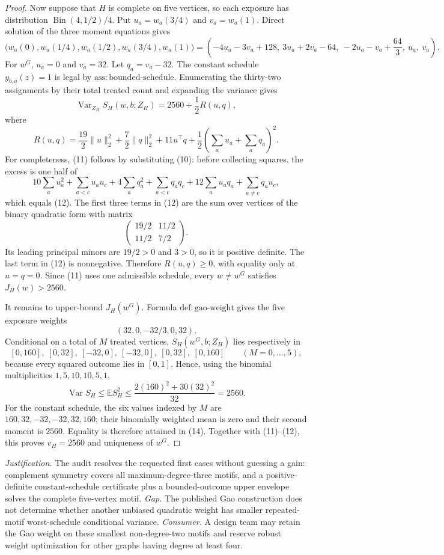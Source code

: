 \documentclass{article}
\begin{document}
\begin{proof}
Now suppose that \(H\) is complete on five vertices, so each exposure has distribution \(\operatorname{Bin}(4,1/2)/4\).  Put \(u_a=w_a(3/4)\) and \(v_a=w_a(1)\).  Direct solution of the three moment equations gives
\[
\bigl(w_a(0),w_a(1/4),w_a(1/2),w_a(3/4),w_a(1)\bigr)
=\left(-4u_a-3v_a+128,\ 3u_a+2v_a-64,\ -2u_a-v_a+\frac{64}{3},\ u_a,\ v_a\right). \tag{10}
\]
For \(w^G\), \(u_a=0\) and \(v_a=32\).  Let \(q_a=v_a-32\).  The constant schedule \(y_{b,a}(z)=1\) is legal by \(\mathrm{ass:bounded\text{-}schedule}\).  Enumerating the thirty-two assignments by their total treated count and expanding the variance gives
\[
\operatorname{Var}_{Z_H}S_H(w,b;Z_H)=2560+\frac12R(u,q), \tag{11}
\]
where
\[
R(u,q)=\frac{19}{2}\|u\|_2^2+\frac72\|q\|_2^2+11u^\top q+\frac12\left(\sum_a u_a+\sum_a q_a\right)^2. \tag{12}
\]
For completeness, (11) follows by substituting (10): before collecting squares, the excess is one half of
\[
10\sum_a u_a^2+\sum_{a<c}u_au_c+4\sum_a q_a^2+\sum_{a<c}q_aq_c
+12\sum_a u_aq_a+\sum_{a\ne c}q_au_c,
\]
which equals (12).  The first three terms in (12) are the sum over vertices of the binary quadratic form with matrix
\[
\begin{pmatrix}19/2&11/2\\11/2&7/2\end{pmatrix}.
\]
Its leading principal minors are \(19/2>0\) and \(3>0\), so it is positive definite.  The last term in (12) is nonnegative.  Therefore \(R(u,q)\ge0\), with equality only at \(u=q=0\).  Since (11) uses one admissible schedule, every \(w\ne w^G\) satisfies \(J_H(w)>2560\).

It remains to upper-bound \(J_H(w^G)\).  Formula \(\mathrm{def:gao\text{-}weight}\) gives the five exposure weights
\[
(32,0,-32/3,0,32).
\]
Conditional on a total of \(M\) treated vertices, \(S_H(w^G,b;Z_H)\) lies respectively in
\[
[0,160],\ [0,32],\ [-32,0],\ [-32,0],\ [0,32],\ [0,160]\qquad(M=0,\ldots,5), \tag{13}
\]
because every squared outcome lies in \([0,1]\).  Hence, using the binomial multiplicities \(1,5,10,10,5,1\),
\[
\operatorname{Var}S_H\le\mathbb E S_H^2
\le\frac{2(160)^2+30(32)^2}{32}=2560. \tag{14}
\]
For the constant schedule, the six values indexed by \(M\) are \(160,32,-32,-32,32,160\); their binomially weighted mean is zero and their second moment is \(2560\).  Equality is therefore attained in (14).  Together with (11)--(12), this proves \(v_H=2560\) and uniqueness of \(w^G\).
\end{proof}
\par\smallskip\noindent \textit{Justification.} The audit resolves the requested first cases without guessing a gain: complement symmetry covers all maximum-degree-three motifs, and a positive-definite constant-schedule certificate plus a bounded-outcome upper envelope solves the complete five-vertex motif. \textit{Gap.} The published Gao construction does not determine whether another unbiased quadratic weight has smaller repeated-motif worst-schedule conditional variance. \textit{Consumer.} A design team may retain the Gao weight on these smallest non-degree-two motifs and reserve robust weight optimization for other graphs having degree at least four.
\end{document}
